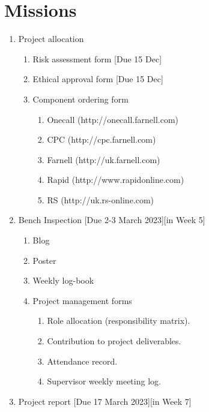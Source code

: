 \documentclass[11pt, a4paper]{article}
\begin{document}
\section{Missions}
\begin{enumerate}
    \item Project allocation
    \begin{enumerate}
	    \item Risk assessment form [Due 15 Dec]
	    \item Ethical approval form [Due 15 Dec]
	    \item Component ordering form
	    \begin{enumerate}
		    \item Onecall (http://onecall.farnell.com)
		    \item CPC (http://cpc.farnell.com)
		    \item Farnell (http://uk.farnell.com)
		    \item Rapid (http://www.rapidonline.com)
		    \item RS (http://uk.rs-online.com)
	    \end{enumerate}
    \end{enumerate}


    \item Bench Inspection [Due 2-3 March 2023][in Week 5]
        \begin{enumerate}
	        \item Blog
	        \item Poster
	        \item Weekly log-book
	        \item Project management forms
	        \begin{enumerate}
	            \item Role allocation (responsibility matrix).
	            \item Contribution to project deliverables.
	            \item Attendance record.
	            \item Supervisor weekly meeting log.
	        \end{enumerate}
        \end{enumerate}

    \item Project report [Due 17 March 2023][in Week 7]
\end{enumerate}

\newpage
\end{document}
